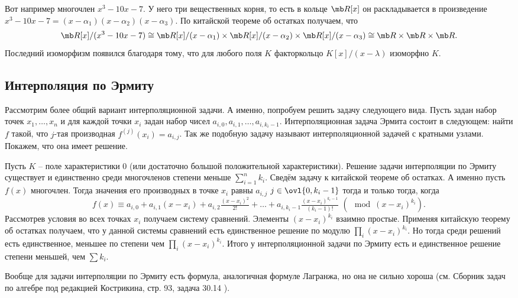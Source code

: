 Вот например многочлен $x^3-10x-7$. У него три вещественных корня, то есть в кольце $\mb R[x]$ он раскладывается в произведение $x^3-10x-7=(x-\alpha_1)(x-\alpha_2)(x-\alpha_3)$. По китайской теореме об остатках получаем, что $$\mb R[x]/(x^3-10x-7) \cong \mb R[x]/(x-\alpha_1)\times \mb R[x]/(x-\alpha_2)\times \mb R[x]/(x-\alpha_3)\cong \mb R\times \mb R\times \mb R.$$
Последний изоморфизм появился благодаря тому, что для любого поля $K$ факторкольцо $K[x]/(x-\lambda)$ изоморфно $K$.


\subsection{Интерполяция по Эрмиту}

Рассмотрим более общий вариант интерполяционной задачи. А именно, попробуем решить задачу следующего вида.
Пусть задан набор точек $x_1,\dots, x_n$ и для каждой точки $x_i$ задан набор чисел $a_{i,0}, a_{i,1},\dots , a_{i,k_i-1}$. Интерполяционная задача Эрмита состоит в следующем: найти $f$ такой, что $j$-тая производная $f^{(j)}(x_i)=a_{i,j}$. Так же подобную задачу называют интерполяционной задачей с кратными узлами. Покажем, что она имеет решение.



\thrm Пусть $K$ -- поле характеристики 0 (или достаточно большой положительной характеристики). Решение задачи интерполяции по Эрмиту существует и единственно среди многочленов степени меньше $\sum_{i=1}^n k_i$.
\ethrm
\proof Сведём задачу к китайской теореме об остатках. А именно пусть $f(x)$ многочлен. Тогда значения его производных в точке $x_i$ равны $a_{i,j}$ $j\in \ovl{0,k_i-1}$ тогда и только тогда, когда
$$f(x)\equiv a_{i,0}+a_{i,1}(x-x_i)+a_{i,2}\tfrac{(x-x_i)^2}{2!}+\dots+ a_{i,k_i-1}\tfrac{(x-x_i)^{k_i-1}}{(k_i-1)!}\,\, (\mod (x-x_i)^{k_i}).$$
Рассмотрев условия во всех точках $x_i$ получаем систему сравнений. Элементы $(x-x_i)^{k_i}$ взаимно простые. Применяя китайскую теорему об остатках получаем, что у данной системы сравнений есть единственное решение по модулю $\prod_{i}(x-x_i)^{k_i}$. Но тогда среди решений есть единственное, меньшее по степени чем $\prod_{i}(x-x_i)^{k_i}$. Итого у интерполяционной задачи по Эрмиту есть и единственное решение степени меньшей, чем $\sum k_i$.
\endproof

\rm Вообще для  задачи интерполяции по Эрмиту  есть формула, аналогичная формуле Лагранжа, но она не сильно хороша (см. Сборник задач по алгебре под редакцией Кострикина, стр. 93, задача 30.14 ).\erm

